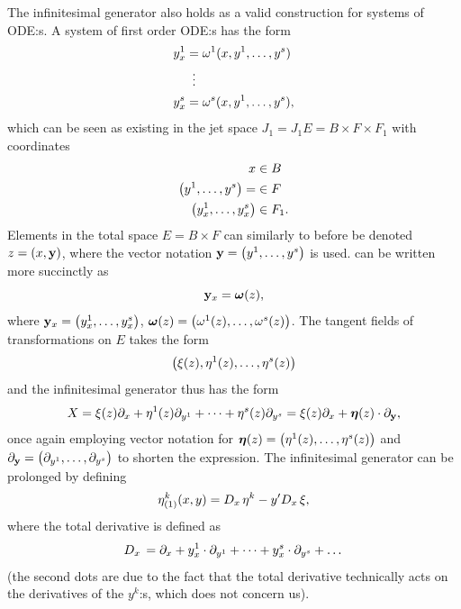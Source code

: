 The infinitesimal generator also holds as a valid construction for systems of ODE:s.
A system of first order ODE:s has the form
\begin{align}
  \begin{split} \label{eq:first-order-system-ode}
    y^1_x &= \omega^1(x, y^1, \dots, y^s) \\
    &\equalsvdots \\
    y^s_x &= \omega^s(x, y^1, \dots, y^s),
  \end{split}
\end{align}
which can be seen as existing in the jet space \(J_1 = J_1 E = B \times F \times F_1\) with coordinates
\begin{align}
  x &\in B \\
  \qty(y^1, \dots, y^s) = &\in F \\
  \qty(y^1_x, \dots, y^s_x) &\in F_1.
\end{align}
Elements in the total space \(E = B \times F\) can similarly to before be denoted \(z = \qty(x, \vb{y})\), where the vector notation \(\vb{y} = \qty(y^1, \dots, y^s)\) is used.
 can be written more succinctly as
\begin{equation} \label{eq:first-order-system-ode-short}
  \vb{y}_x = \vb*{\omega}(z),
\end{equation}
where \(\vb{y}_x = \qty(y^1_x, \dots, y^s_x)\), \(\vb*{\omega}(z) = \qty(\omega^1(z), \dots, \omega^s(z))\).
The tangent fields of transformations on \(E\) takes the form
\begin{equation} \label{eq:tangent-field-gen}
  \pqty{\xi(z), \eta^1(z), \dots, \eta^s(z)}
\end{equation}
and the infinitesimal generator thus has the form
\begin{equation}
  X = \xi(z) \partial_x + \eta^1(z) \partial_{y^1} + \dots + \eta^s(z) \partial_{y^s} = \xi(z) \partial_x + \vb*{\eta}(z) \cdot \partial_{\vb{y}},
\end{equation}
once again employing vector notation for \(\vb*{\eta}(z) = \qty(\eta^1(z), \dots, \eta^s(z))\) and \(\partial_{\vb{y}} = \qty(\partial_{y^1}, \dots, \partial_{y^s})\) to shorten the expression.
The infinitesimal generator can be prolonged by defining
\begin{equation}
  {\eta^k_{(1)}}(x,y) =
  D_{x}\, \eta^k - y' D_{x}\, \xi,
\end{equation}
where the total derivative is defined as
\begin{equation}
  D_{x}\, = \partial_x + y^1_x \cdot \partial_{y^1} + \dots + y^s_x \cdot \partial_{y^s} + \dots
\end{equation}
(the second dots are due to the fact that the total derivative technically acts on the derivatives of the \(y^k\):s, which does not concern us).

